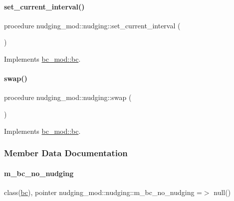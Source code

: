 \paragraph{\texorpdfstring{set\+\_\+current\+\_\+interval()}{set\_current\_interval()}}
{\footnotesize\ttfamily procedure nudging\+\_\+mod\+::nudging\+::set\+\_\+current\+\_\+interval (\begin{DoxyParamCaption}{ }\end{DoxyParamCaption})\hspace{0.3cm}{\ttfamily [private]}}



Implements \mbox{\hyperlink{structbc__mod_1_1bc_adf9262a425534bd18d98809381034ca1}{bc\+\_\+mod\+::bc}}.

\mbox{\label{structnudging__mod_1_1nudging_a9015b684c729f54ba0fe1abc15b28a49}} 
\paragraph{\texorpdfstring{swap()}{swap()}}
{\footnotesize\ttfamily procedure nudging\+\_\+mod\+::nudging\+::swap (\begin{DoxyParamCaption}{ }\end{DoxyParamCaption})\hspace{0.3cm}{\ttfamily [private]}}



Implements \mbox{\hyperlink{structbc__mod_1_1bc_a925ae5960dbfc854eab908c52c13f719}{bc\+\_\+mod\+::bc}}.



\subsubsection{Member Data Documentation}
\mbox{\label{structnudging__mod_1_1nudging_a07ce30551ce62c0cfebc1a58f1eb3505}} 
\paragraph{\texorpdfstring{m\+\_\+bc\+\_\+no\+\_\+nudging}{m\_bc\_no\_nudging}}
{\footnotesize\ttfamily class(\mbox{\hyperlink{structbc__mod_1_1bc}{bc}}), pointer nudging\+\_\+mod\+::nudging\+::m\+\_\+bc\+\_\+no\+\_\+nudging =$>$ null()\hspace{0.3cm}{\ttfamily [private]}}

